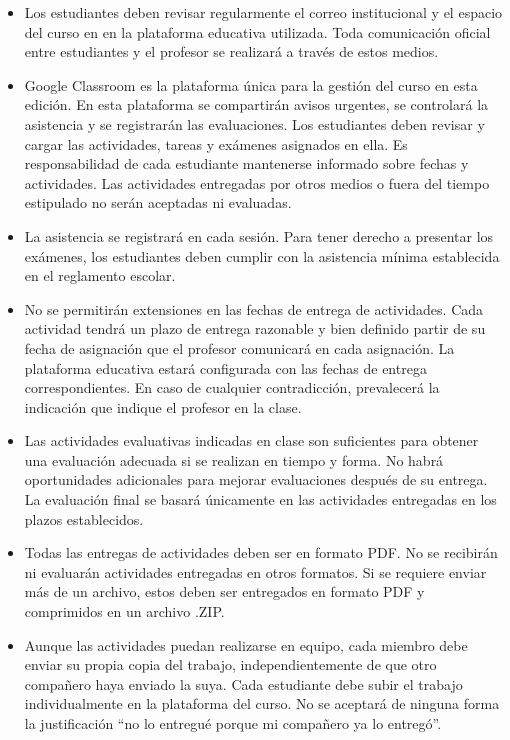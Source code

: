 \documentclass[
  coursetitle={Cómputo Nube y Tecnologías Emergentes},
  coursehours={96},
  coursedate={Verano 2026},
  doctype={Guía del curso},
  otherlangs={english,french},
  authorname={Lázaro},
  authorsurname={Bustio-Martínez},
  authortitle={PhD},
  role={Profesor Investigador},
  email={lbustio@inaoe.mx},
  phone={5559504000},
  ext={7459},
  institution={Instituto Nacional de Astrofísica, Óptica y Electrónica (INAOE)},
  department={Maestría en Ciencias en Tecnologías de Seguridad},
  address={Luis Enrique Erro 1, Sta. Ma. Tonantzintla, San Andrés Cholula, CP 72840, Puebla, México},
  margin={0.5in}
]{lbustio_lecture_notes}
\begin{document}
\begin{itemize}
  \item Los estudiantes deben revisar regularmente el correo institucional y el espacio del curso en en la plataforma educativa utilizada. Toda comunicación oficial entre estudiantes y el profesor se realizará a través de estos medios.
  \item Google Classroom es la plataforma única para la gestión del curso en esta edición. En esta plataforma se compartirán avisos urgentes, se controlará la asistencia y se registrarán las evaluaciones. Los estudiantes deben revisar y cargar las actividades, tareas y exámenes asignados en ella. Es responsabilidad de cada estudiante mantenerse informado sobre fechas y actividades. Las actividades entregadas por otros medios o fuera del tiempo estipulado no serán aceptadas ni evaluadas.
  \item La asistencia se registrará en cada sesión. Para tener derecho a presentar los exámenes, los estudiantes deben cumplir con la asistencia mínima establecida en el reglamento escolar.
  \item No se permitirán extensiones en las fechas de entrega de actividades. Cada actividad tendrá un plazo de entrega razonable y bien definido partir de su fecha de asignación que el profesor comunicará en cada asignación. La plataforma educativa estará configurada con las fechas de entrega correspondientes. En caso de cualquier contradicción, prevalecerá la indicación que indique el profesor en la clase.
  \item Las actividades evaluativas indicadas en clase son suficientes para obtener una evaluación adecuada si se realizan en tiempo y forma. No habrá oportunidades adicionales para mejorar evaluaciones después de su entrega. La evaluación final se basará únicamente en las actividades entregadas en los plazos establecidos.
  \item Todas las entregas de actividades deben ser en formato PDF. No se recibirán ni evaluarán actividades entregadas en otros formatos. Si se requiere enviar más de un archivo, estos deben ser entregados en formato PDF y comprimidos en un archivo .ZIP.
  \item Aunque las actividades puedan realizarse en equipo, cada miembro debe enviar su propia copia del trabajo, independientemente de que otro compañero haya enviado la suya. Cada estudiante debe subir el trabajo individualmente en la plataforma del curso. No se aceptará de ninguna forma la justificación “no lo entregué porque mi compañero ya lo entregó”.

\end{itemize}
\end{document}
